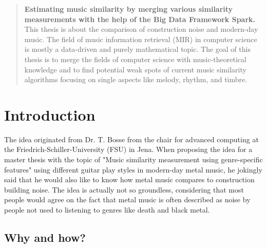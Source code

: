 \begin{abstract}
	\noindent \textbf{Estimating music similarity by merging various similarity measurements with the help of the Big Data Framework Spark.}\\
	This thesis is about the comparison of construction noise and modern-day music. 
	The field of music information retrieval (MIR) in computer science is mostly a data-driven and purely mathematical topic. The goal of this thesis is to merge the fields of computer science with music-theoretical knowledge and to find potential weak spots of current music similarity algorithms focusing on single aspects like melody, rhythm, and timbre. 

\end{abstract}


\mainmatter %

\chapter{Introduction}

The idea originated from Dr. T. Bosse from the chair for advanced computing at the Friedrich-Schiller-University (FSU) in Jena. When proposing the idea for a master thesis with the topic of "Music similarity measurement using genre-specific features" using different guitar play styles in modern-day metal music, he jokingly said that he would also like to know how metal music compares to construction building noise.
The idea is actually not so groundless, considering that most people would agree on the fact that metal music is often described as noise by people not used to listening to genres like death and black metal.

\section{Why and how?}

